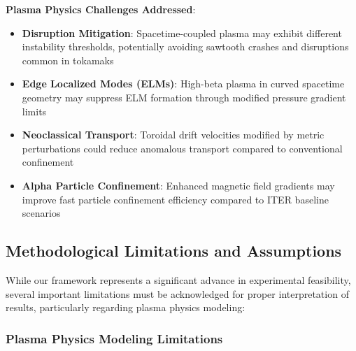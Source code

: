 \documentclass[10pt,twocolumn]{article}
\begin{document}
\textbf{Plasma Physics Challenges Addressed}:
\begin{itemize}
\item \textbf{Disruption Mitigation}: Spacetime-coupled plasma may exhibit different instability thresholds, potentially avoiding sawtooth crashes and disruptions common in tokamaks
\item \textbf{Edge Localized Modes (ELMs)}: High-beta plasma in curved spacetime geometry may suppress ELM formation through modified pressure gradient limits
\item \textbf{Neoclassical Transport}: Toroidal drift velocities modified by metric perturbations could reduce anomalous transport compared to conventional confinement
\item \textbf{Alpha Particle Confinement}: Enhanced magnetic field gradients may improve fast particle confinement efficiency compared to ITER baseline scenarios
\end{itemize}

\subsection{Methodological Limitations and Assumptions}

While our framework represents a significant advance in experimental feasibility, several important limitations must be acknowledged for proper interpretation of results, particularly regarding plasma physics modeling:

\subsubsection{Plasma Physics Modeling Limitations}
\end{document}

